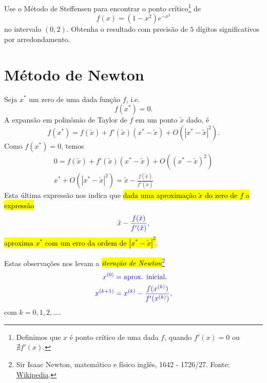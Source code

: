 \begin{exer}
  Use o Método de Steffensen para encontrar o ponto crítico\footnote{Definimos que $x$ é ponto crítico de uma dada $f$, quando $f'(x) = 0$ ou $\nexists f'(x)$.} de
  \begin{equation}
    f(x) = (1-x^2)e^{-x^2}
  \end{equation}
  no intervalo $(0, 2)$. Obtenha o resultado com precisão de $5$ dígitos significativos por arredondamento.
\end{exer}

\section{Método de Newton}\label{cap_eq1d_sec_newton}

Seja $x^*$ um zero de uma dada função $f$, i.e.
\begin{equation}
  f(x^*)=0.
\end{equation}
A expansão em polinômio de Taylor{\taylor} de $f$ em um ponto $\tilde{x}$ dado, é
\begin{equation}
  f(x^*) = f(\tilde{x}) + f'(\tilde{x})(x^*-\tilde{x}) + O(|x^*-\tilde{x}|^2).
\end{equation}
Como $f(x^*)=0$, temos
\begin{gather}
  0 = f(\tilde{x}) + f'(\tilde{x})(x^*-\tilde{x}) + O((x^*-\tilde{x})^2)\\
  x^* + O(|x^*-\tilde{x}|^2) = \tilde{x} - \frac{f(\tilde{x})}{f'(\tilde{x})}
\end{gather}
Esta última expressão nos indica que \hl{dada uma aproximação $\tilde{x}$ do zero de $f$ a expressão}
\begin{equation}
  \color{blue}\tilde{x} - \frac{f(\tilde{x})}{f'(\tilde{x})},
\end{equation}
\hl{aproxima $x^*$ com um erro da ordem de $|x^*-\tilde{x}|^2$}.

Estas observações nos levam a \hl{\emph{iteração de Newton}}\footnote{Sir Isaac Newton, matemático e físico inglês, 1642 - 1726/27. Fonte: \href{https://en.wikipedia.org/wiki/Isaac_Newton}{Wikipedia}.}
\begin{align}
  \color{blue}x^{(0)} &\color{blue}= \text{aprox. inicial},\\
  \color{blue}x^{(k+1)} &\color{blue}= x^{(k)} - \frac{f(x^{(k)})}{f'(x^{(k)})},\label{cap_eq1d_sec_newton:eq:Newton_iteracao}
\end{align}
com $k=0, 1, 2, \ldots$.

